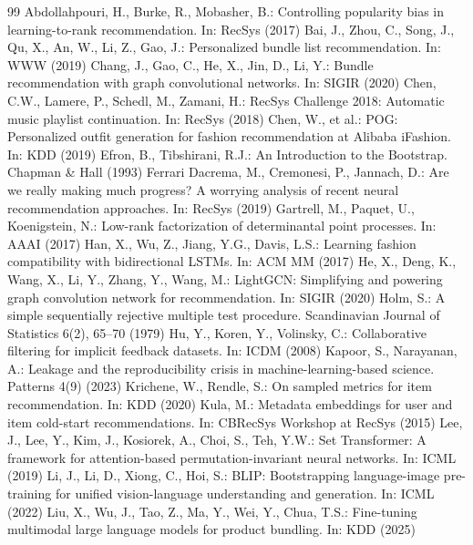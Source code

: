\documentclass[runningheads]{llncs}
\begin{document}
\begin{thebibliography}{99}\scriptsize
{} Abdollahpouri, H., Burke, R., Mobasher, B.: Controlling popularity bias in learning-to-rank recommendation. In: RecSys (2017)
 Bai, J., Zhou, C., Song, J., Qu, X., An, W., Li, Z., Gao, J.: Personalized bundle list recommendation. In: WWW (2019)
 Chang, J., Gao, C., He, X., Jin, D., Li, Y.: Bundle recommendation with graph convolutional networks. In: SIGIR (2020)
 Chen, C.W., Lamere, P., Schedl, M., Zamani, H.: RecSys Challenge 2018: Automatic music playlist continuation. In: RecSys (2018)
 Chen, W., et al.: POG: Personalized outfit generation for fashion recommendation at Alibaba iFashion. In: KDD (2019)
 Efron, B., Tibshirani, R.J.: An Introduction to the Bootstrap. Chapman \& Hall (1993)
 Ferrari Dacrema, M., Cremonesi, P., Jannach, D.: Are we really making much progress? A worrying analysis of recent neural recommendation approaches. In: RecSys (2019)
 Gartrell, M., Paquet, U., Koenigstein, N.: Low-rank factorization of determinantal point processes. In: AAAI (2017)
 Han, X., Wu, Z., Jiang, Y.G., Davis, L.S.: Learning fashion compatibility with bidirectional LSTMs. In: ACM MM (2017)
 He, X., Deng, K., Wang, X., Li, Y., Zhang, Y., Wang, M.: LightGCN: Simplifying and powering graph convolution network for recommendation. In: SIGIR (2020)
 Holm, S.: A simple sequentially rejective multiple test procedure. Scandinavian Journal of Statistics 6(2), 65--70 (1979)
 Hu, Y., Koren, Y., Volinsky, C.: Collaborative filtering for implicit feedback datasets. In: ICDM (2008)
 Kapoor, S., Narayanan, A.: Leakage and the reproducibility crisis in machine-learning-based science. Patterns 4(9) (2023)
 Krichene, W., Rendle, S.: On sampled metrics for item recommendation. In: KDD (2020)
 Kula, M.: Metadata embeddings for user and item cold-start recommendations. In: CBRecSys Workshop at RecSys (2015)
 Lee, J., Lee, Y., Kim, J., Kosiorek, A., Choi, S., Teh, Y.W.: Set Transformer: A framework for attention-based permutation-invariant neural networks. In: ICML (2019)
 Li, J., Li, D., Xiong, C., Hoi, S.: BLIP: Bootstrapping language-image pre-training for unified vision-language understanding and generation. In: ICML (2022)
 Liu, X., Wu, J., Tao, Z., Ma, Y., Wei, Y., Chua, T.S.: Fine-tuning multimodal large language models for product bundling. In: KDD (2025)

\end{thebibliography}
\end{document}
